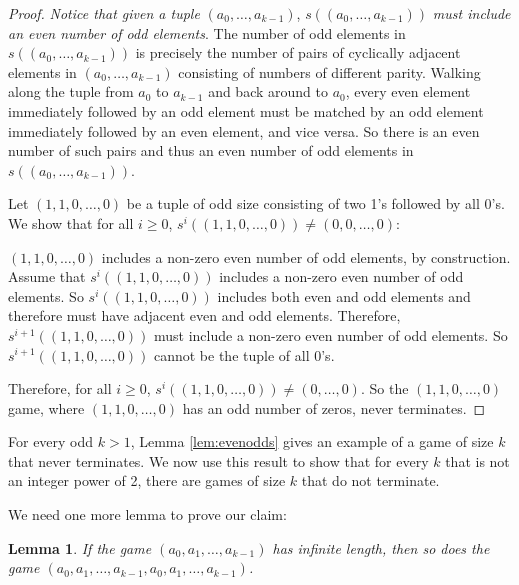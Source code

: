 \documentclass[12pt]{amsart}
\newtheorem{lemma}[theorem]{Lemma}
\newcommand{\diff}{s}
\begin{document}
\begin{proof}
\emph{Notice that given a tuple} $(a_0, \ldots, a_{k-1})$,  $\diff ((a_0, \ldots, a_{k-1}))$ \emph{must include an even number of odd elements}. The number of odd elements in $\diff ((a_0, \ldots, a_{k-1}))$ is precisely the number of pairs of cyclically adjacent elements in  $(a_0, \ldots, a_{k-1})$ consisting of numbers of different parity. Walking along the tuple from $a_0$ to $a_{k-1}$ and back around to $a_0$, every even element immediately followed by an odd element must be matched by an odd element immediately followed by an even element, and vice versa. So there is an even number of such pairs and thus an even number of odd elements in  $\diff((a_0, \ldots, a_{k-1}))$.

Let $(1, 1, 0, \ldots, 0)$ be a tuple of odd size consisting of two 1's followed by all 0's. We show that for all $i \geq 0$, $\diff^{i}((1, 1, 0, \ldots, 0)) \neq (0, 0, \ldots, 0)$:

$(1, 1, 0, \ldots, 0)$ includes a non-zero even number of odd elements, by construction. Assume that $\diff^i((1, 1, 0, \ldots, 0))$ includes a non-zero even number of odd elements. So $\diff^i((1, 1, 0, \ldots, 0))$ includes both even and odd elements and therefore must have adjacent even and odd elements. Therefore, $\diff^{i+1}((1, 1, 0, \ldots, 0))$ must include a non-zero even number of odd elements. So  $\diff^{i+1}((1, 1, 0, \ldots, 0))$ cannot be the tuple of all $0$'s.

Therefore, for all $i \geq 0$, $\diff^i((1, 1, 0, \ldots, 0)) \neq (0, \ldots, 0)$. So the $(1, 1, 0, \ldots, 0)$ game, where $(1, 1, 0, \ldots, 0)$ has an odd number of zeros, never terminates.
\end{proof}

For every odd $k > 1$, Lemma \ref{lem:evenodds} gives an example of a game of size $k$ that never terminates. We now use this result to show that for every $k$ that is not an integer power of 2, there are games of size $k$ that do not terminate.

We need one more lemma to prove our claim:

\begin{lemma}
\label{lem:doubles}
If the game $(a_0, a_1, \ldots, a_{k-1})$ has infinite length, then so does the game $(a_0, a_1, \ldots, a_{k-1}, a_0, a_1, \ldots, a_{k-1})$.
\end{lemma}
\end{document}
